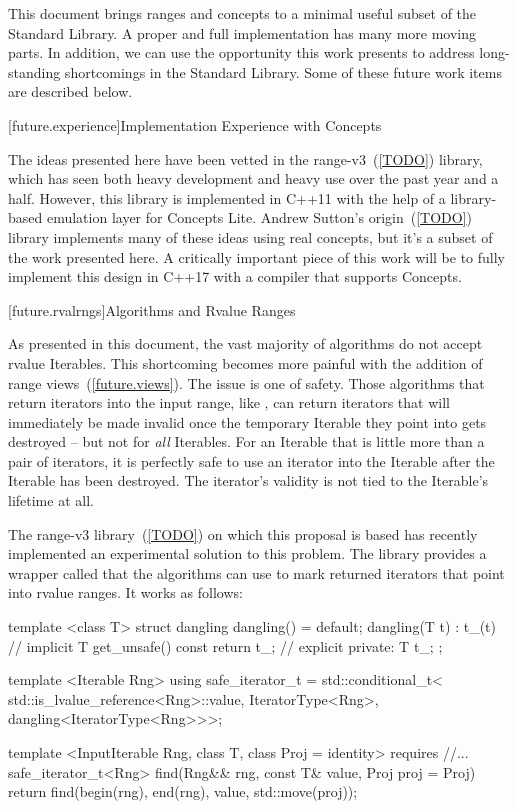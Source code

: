 
\pnum
This document brings ranges and concepts to a minimal useful subset of the Standard Library.
A proper and full implementation has many more moving parts. In addition, we can use the opportunity
this work presents to address long-standing shortcomings in the Standard Library. Some of these
future work items are described below.

[future.experience]{Implementation Experience with Concepts}

\pnum
The ideas presented here have been vetted in the range-v3~(\ref{TODO}) library, which has seen both heavy
development and heavy use over the past year and a half. However, this library is implemented in
C++11 with the help of a library-based emulation layer for Concepts Lite. Andrew Sutton's origin~(\ref{TODO})
library implements many of these ideas using real concepts, but it's a subset of the work presented
here. A critically important piece of this work will be to fully implement this design in C++17 with
a compiler that supports Concepts.

[future.rvalrngs]{Algorithms and Rvalue Ranges}

\pnum
As presented in this document, the vast majority of algorithms do not accept rvalue Iterables.
This shortcoming becomes more painful with the addition of range views~(\ref{future.views}).
The issue is one of safety. Those algorithms that return iterators into the input range, like
, can return iterators that will immediately be made invalid once the temporary
Iterable they point into gets destroyed -- but not for \textit{all} Iterables. For an Iterable that
is little more than a pair of iterators, it is perfectly safe to use an iterator into the Iterable
after the Iterable has been destroyed. The iterator's validity is not tied to the Iterable's
lifetime at all.

\pnum
The range-v3 library~(\ref{TODO}) on which this proposal is based has recently implemented an
experimental solution to this problem. The library provides a wrapper called 
that the algorithms can use to mark returned iterators that point into rvalue ranges. It works
as follows:

\begin{codeblock}
  template <class T>
  struct dangling {
    dangling() = default;
    dangling(T t) : t_(t) {}            // implicit
    T get_unsafe() const { return t_; } // explicit
  private:
    T t_;
  };

  template <Iterable Rng>
  using safe_iterator_t =
    std::conditional_t<
      std::is_lvalue_reference<Rng>::value,
      IteratorType<Rng>,
      dangling<IteratorType<Rng>>>;

  template <InputIterable Rng, class T, class Proj = identity>
    requires //...
    safe_iterator_t<Rng>
      find(Rng&& rng, const T& value, Proj proj = Proj{}) {
        return find(begin(rng), end(rng), value, std::move(proj));
      }
\end{codeblock}

